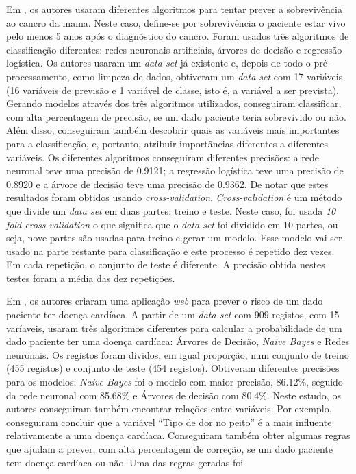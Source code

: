 Em \cite{cancer}, os autores usaram diferentes algoritmos para tentar prever a sobrevivência ao cancro da mama. Neste caso, define-se por sobrevivência o paciente estar vivo pelo menos 5 anos após o diagnóstico do cancro. Foram usados três algoritmos de classificação diferentes: redes neuronais artificiais, árvores de decisão e regressão logística. Os autores usaram um \textit{data set} já existente e, depois de todo o pré-processamento, como limpeza de dados, obtiveram um \textit{data set} com 17 variáveis (16 variáveis de previsão e 1 variável de classe, isto é, a variável a ser prevista). Gerando modelos através dos três algoritmos utilizados, conseguiram classificar, com alta percentagem de precisão, se um dado paciente teria sobrevivido ou não. Além disso, conseguiram também descobrir quais as variáveis mais importantes para a classificação, e, portanto, atribuir importâncias diferentes a diferentes variáveis. Os diferentes algoritmos conseguiram diferentes precisões: a rede neuronal teve uma precisão de 0.9121; a regressão logística teve uma precisão de 0.8920 e a árvore de decisão teve uma precisão de 0.9362. De notar que estes resultados foram obtidos usando \textit{cross-validation}. \textit{Cross-validation} é um método que divide um \textit{data set} em duas partes: treino e teste. Neste caso, foi usada \textit{10 fold cross-validation} o que significa que o \textit{data set} foi dividido em 10 partes, ou seja, nove partes são usadas para treino e gerar um modelo. Esse modelo vai ser usado na parte restante para classificação e este processo é repetido dez vezes. Em cada repetição, o conjunto de teste é diferente. A precisão obtida nestes testes foram a média das dez repetições.

Em \cite{sota2}, os autores criaram uma aplicação \textit{web} para prever o risco de um dado paciente ter doença cardíaca. A partir de um \textit{data set} com 909 registos, com 15 varíaveis, usaram três algoritmos diferentes para calcular a probabilidade de um dado paciente ter uma doença cardíaca: Árvores de Decisão, \textit{Naive Bayes} e Redes neuronais. Os registos foram dividos, em igual proporção, num conjunto de treino (455 registos) e conjunto de teste (454 registos). Obtiveram diferentes precisões para os modelos: \textit{Naive Bayes} foi o modelo com maior precisão, 86.12\%, seguido da rede neuronal com 85.68\% e Árvores de decisão com 80.4\%. Neste estudo, os autores conseguiram também encontrar relações entre variáveis. Por exemplo, conseguiram concluir que a variável ``Tipo de dor no peito'' é a mais influente relativamente a uma doença cardíaca. Conseguiram também obter algumas regras que ajudam a prever, com alta percentagem de correção, se um dado paciente tem doença cardíaca ou não. Uma das regras geradas foi 

